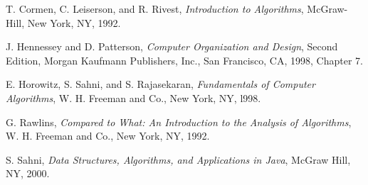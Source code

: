 \begin{thebibliography}{99}
T. Cormen, C. Leiserson,
and R. Rivest,
{\it Introduction to Algorithms},
McGraw-Hill, New York, NY, 1992.

J. Hennessey
and D. Patterson,
{\it Computer  Organization and Design},
Second Edition,
Morgan Kaufmann Publishers, Inc., San Francisco, CA, 1998, Chapter 7.

E. Horowitz,
S. Sahni, and S. Rajasekaran,
{\it Fundamentals of Computer Algorithms},
W. H. Freeman and Co., New York, NY, l998.

G. Rawlins,
{\it Compared to What: An Introduction to the Analysis of Algorithms},
W. H. Freeman and Co., New York, NY, 1992.

S. Sahni,
{\it Data Structures, Algorithms, and Applications in Java},
McGraw Hill, NY, 2000.

\end{thebibliography}
